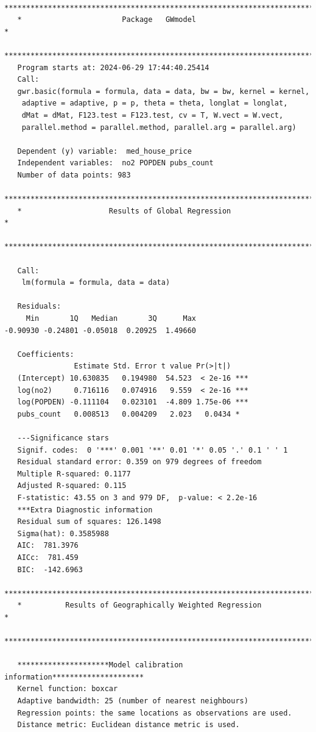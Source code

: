 \documentclass[
  letterpaper,
]{scrbook}
\begin{document}
\begin{verbatim}
   ***********************************************************************
   *                       Package   GWmodel                             *
   ***********************************************************************
   Program starts at: 2024-06-29 17:44:40.25414 
   Call:
   gwr.basic(formula = formula, data = data, bw = bw, kernel = kernel, 
    adaptive = adaptive, p = p, theta = theta, longlat = longlat, 
    dMat = dMat, F123.test = F123.test, cv = T, W.vect = W.vect, 
    parallel.method = parallel.method, parallel.arg = parallel.arg)

   Dependent (y) variable:  med_house_price
   Independent variables:  no2 POPDEN pubs_count
   Number of data points: 983
   ***********************************************************************
   *                    Results of Global Regression                     *
   ***********************************************************************

   Call:
    lm(formula = formula, data = data)

   Residuals:
     Min       1Q   Median       3Q      Max 
-0.90930 -0.24801 -0.05018  0.20925  1.49660 

   Coefficients:
                Estimate Std. Error t value Pr(>|t|)    
   (Intercept) 10.630835   0.194980  54.523  < 2e-16 ***
   log(no2)     0.716116   0.074916   9.559  < 2e-16 ***
   log(POPDEN) -0.111104   0.023101  -4.809 1.75e-06 ***
   pubs_count   0.008513   0.004209   2.023   0.0434 *  

   ---Significance stars
   Signif. codes:  0 '***' 0.001 '**' 0.01 '*' 0.05 '.' 0.1 ' ' 1 
   Residual standard error: 0.359 on 979 degrees of freedom
   Multiple R-squared: 0.1177
   Adjusted R-squared: 0.115 
   F-statistic: 43.55 on 3 and 979 DF,  p-value: < 2.2e-16 
   ***Extra Diagnostic information
   Residual sum of squares: 126.1498
   Sigma(hat): 0.3585988
   AIC:  781.3976
   AICc:  781.459
   BIC:  -142.6963
   ***********************************************************************
   *          Results of Geographically Weighted Regression              *
   ***********************************************************************

   *********************Model calibration information*********************
   Kernel function: boxcar 
   Adaptive bandwidth: 25 (number of nearest neighbours)
   Regression points: the same locations as observations are used.
   Distance metric: Euclidean distance metric is used.


\end{verbatim}
\end{document}
